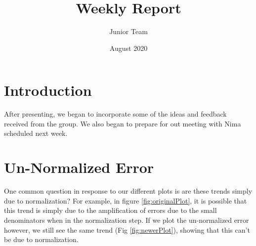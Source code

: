 \documentclass{article}
\title{Weekly Report}
\author{Junior Team }
\date{August 2020}
\begin{document}
\maketitle

\section*{Introduction}
After presenting, we began to incorporate some of the ideas and feedback received from the group. We also began to prepare for out meeting with Nima scheduled next week. 

\section{Un-Normalized Error}
One common question in response to our different plots is are these trends simply due to normalization? For example, in figure \ref{fig:originalPlot}, it is possible that this trend is simply due to the amplification of errors due to the small denominators when in the normalization step. If we plot the un-normalized error however, we still see the same trend (Fig \ref{fig:newerPlot}), showing that this can't be due to normalization. 
\end{document}
